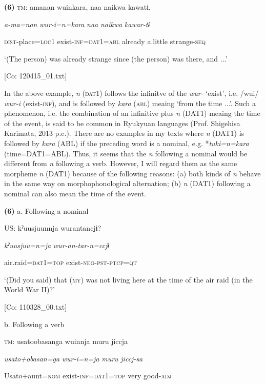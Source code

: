 \textbf{(6)}  \textsc{tm}:  amanan  wuinkara,  naa  naikwa  kawatɨ,

    \textit{a-ma=nan}  \textit{wur-i=n=kara}  \textit{naa}  \textit{naikwa}  \textit{kawar-tɨ}

    \textsc{dist}-place=\textsc{loc}1  exist-\textsc{inf}=\textsc{dat}1=\textsc{abl}  already  a.little  strange-\textsc{seq}

    ‘(The person) was already strange since (the person) was there, and ...’

    [Co: 120415\_01.txt]

In the above example, \textit{n} (\textsc{dat}1) follows the infinitve of the \textit{wur-} ‘exist’, i.e. /wui/ \textit{wur-i} (exist-\textsc{inf}), and is followed by \textit{kara} (\textsc{abl}) meaing ‘from the time ...’. Such a phenomenon, i.e. the combination of an infinitive plus \textit{n} (DAT1) meaing the time of the event, is said to be common in Ryukyuan languages (Prof. Shigehisa Karimata, 2013 p.c.). There are no examples in my texts where \textit{n} (DAT1) is followed by \textit{kara} (ABL) if the preceding word is a nominal, e.g. *\textit{tuki=n=kara} (time=DAT1=ABL). Thus, it seems that the \textit{n} following a nominal would be different from \textit{n} following a verb. However, I will regard them as the same morpheme \textit{n} (DAT1) because of the following reasons: (a) both kinds of \textit{n} behave in the same way on morphophonological alternation; (b) \textit{n} (DAT1) following a nominal can also mean the time of the event.

\textbf{(6)}  a.  Following a nominal

    US:  kˀuusjuunnja  wurantancjɨ?

      \textit{kˀuusjuu=n=ja}  \textit{wur-an-tar-n=ccjɨ}

      air.raid=\textsc{dat}1=\textsc{top}  exist-\textsc{neg}-\textsc{pst}-\textsc{ptcp}=\textsc{qt}

      ‘(Did you said) that (\textsc{my}) was not living here at the time of the air raid (in the World War II)?’

      [Co: 110328\_00.txt]

  b.  Following a verb

    \textsc{tm}:  usato{\textbar}obasan{\textbar}ga  wuinnja  muru  jiccja

      \textit{usato+obasan=ga}  \textit{wur-i=n=ja}  \textit{muru}  \textit{jiccj-sa}

      Usato+aunt=\textsc{nom}  exist-\textsc{inf}=\textsc{dat}1=\textsc{top}  very  good-\textsc{adj}

